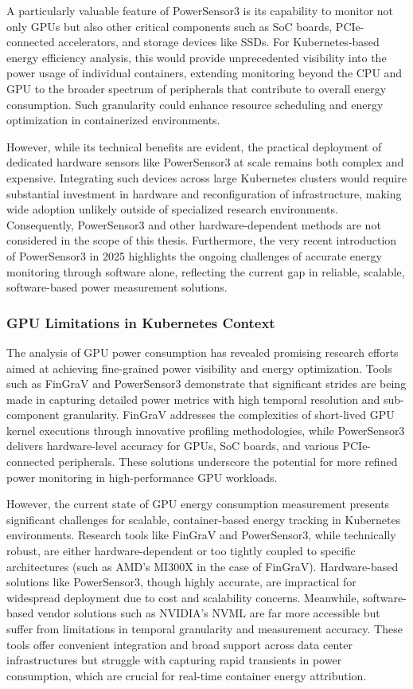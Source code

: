 A particularly valuable feature of PowerSensor3 is its capability to monitor not only GPUs but also other critical components such as SoC boards, PCIe-connected accelerators, and storage devices like SSDs. For Kubernetes-based energy efficiency analysis, this would provide unprecedented visibility into the power usage of individual containers, extending monitoring beyond the CPU and GPU to the broader spectrum of peripherals that contribute to overall energy consumption. Such granularity could enhance resource scheduling and energy optimization in containerized environments.

However, while its technical benefits are evident, the practical deployment of dedicated hardware sensors like PowerSensor3 at scale remains both complex and expensive. Integrating such devices across large Kubernetes clusters would require substantial investment in hardware and reconfiguration of infrastructure, making wide adoption unlikely outside of specialized research environments. Consequently, PowerSensor3 and other hardware-dependent methods are not considered in the scope of this thesis. Furthermore, the very recent introduction of PowerSensor3 in 2025 highlights the ongoing challenges of accurate energy monitoring through software alone, reflecting the current gap in reliable, scalable, software-based power measurement solutions.

\subsubsection{GPU Limitations in Kubernetes Context}

The analysis of GPU power consumption has revealed promising research efforts aimed at achieving fine-grained power visibility and energy optimization. Tools such as FinGraV and PowerSensor3 demonstrate that significant strides are being made in capturing detailed power metrics with high temporal resolution and sub-component granularity. FinGraV addresses the complexities of short-lived GPU kernel executions through innovative profiling methodologies, while PowerSensor3 delivers hardware-level accuracy for GPUs, SoC boards, and various PCIe-connected peripherals. These solutions underscore the potential for more refined power monitoring in high-performance GPU workloads.

However, the current state of GPU energy consumption measurement presents significant challenges for scalable, container-based energy tracking in Kubernetes environments. Research tools like FinGraV and PowerSensor3, while technically robust, are either hardware-dependent or too tightly coupled to specific architectures (such as AMD's MI300X in the case of FinGraV). Hardware-based solutions like PowerSensor3, though highly accurate, are impractical for widespread deployment due to cost and scalability concerns. Meanwhile, software-based vendor solutions such as NVIDIA's NVML are far more accessible but suffer from limitations in temporal granularity and measurement accuracy. These tools offer convenient integration and broad support across data center infrastructures but struggle with capturing rapid transients in power consumption, which are crucial for real-time container energy attribution.

